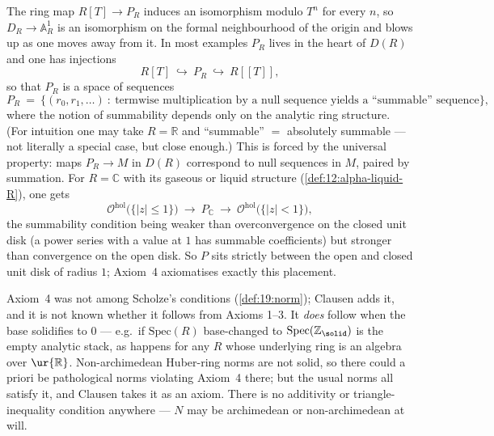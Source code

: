 \begin{remark}
\label{rmk:20:disk-motivation}
The ring map $R[T]\to P_R$ induces an isomorphism modulo $T^n$ for every $n$, so
$D_R\to\mathbb A^1_R$ is an isomorphism on the formal neighbourhood of the origin
and blows up as one moves away from it. In most examples $P_R$ lives in the heart
of $D(R)$ and one has injections
\begin{equation*}
R[T]\ \hookrightarrow\ P_R\ \hookrightarrow\ R[[T]],
\end{equation*}
so that $P_R$ is a space of sequences
\begin{equation*}
P_R\ =\ \bigl\{(r_0,r_1,\dots)\ :\ \text{termwise multiplication by a null
sequence yields a ``summable'' sequence}\bigr\},
\end{equation*}
where the notion of summability depends only on the analytic ring structure. (For
intuition one may take $R=\mathbb R$ and ``summable'' $=$ absolutely summable ---
not literally a special case, but close enough.) This is forced by the universal
property: maps $P_R\to M$ in $D(R)$ correspond to null sequences in $M$, paired
by summation. For $R=\mathbb C$ with its gaseous or liquid structure
(\cref{def:12:alpha-liquid-R}), one gets
\begin{equation*}
\mathcal O^{\mathrm{hol}}\bigl(\{|z|\le1\}\bigr)\ \longrightarrow\ P_{\mathbb C}\
\longrightarrow\ \mathcal O^{\mathrm{hol}}\bigl(\{|z|<1\}\bigr),
\end{equation*}
the summability condition being weaker than overconvergence on the closed unit
disk (a power series with a value at $1$ has summable coefficients) but stronger
than convergence on the open disk. So $P$ sits strictly between the open and
closed unit disk of radius $1$; Axiom~4 axiomatises exactly this placement.
\end{remark}

\begin{remark}
\label{rmk:20:axiom4-status}
Axiom~4 was not among Scholze's conditions (\cref{def:19:norm}); Clausen adds it,
and it is not known whether it follows from Axioms 1--3. It \emph{does} follow
when the base solidifies to $0$ --- e.g.\ if $\mathrm{Spec}(R)$ base-changed to
$\mathrm{Spec}(\mathbb Z_\solid)$ is the empty analytic stack, as happens for any
$R$ whose underlying ring is an algebra over $\ur{\mathbb R}$. Non-archimedean
Huber-ring norms are not solid, so there could a priori be pathological norms
violating Axiom~4 there; but the usual norms all satisfy it, and Clausen takes it
as an axiom. There is no additivity or triangle-inequality condition anywhere ---
$N$ may be archimedean or non-archimedean at will.
\end{remark}

